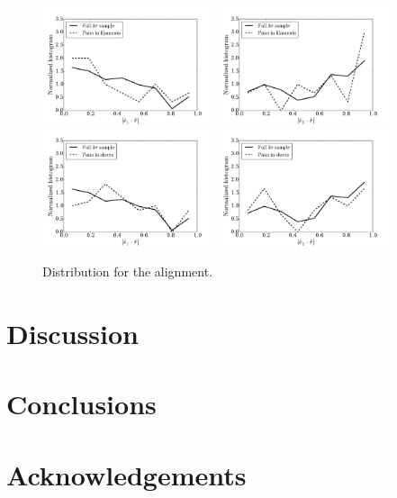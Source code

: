\documentclass{emulateapj}
\begin{document}
\begin{figure}
\begin{center}
  \includegraphics[width=0.45\textwidth]{align_filament_pos_e1_3S.pdf}
  \includegraphics[width=0.45\textwidth]{align_filament_pos_e3_3S.pdf}\\
  \includegraphics[width=0.45\textwidth]{align_sheet_pos_e1_3S.pdf}
  \includegraphics[width=0.45\textwidth]{align_sheet_pos_e3_3S.pdf}
\end{center}
\caption{Distribution for the alignment.
    \label{fig:alignment}}  
\end{figure}

\section{Discussion}
\label{sec:discussion}

\section{Conclusions}
\label{sec:conclusions}


\section*{Acknowledgements}


 
\end{document}
